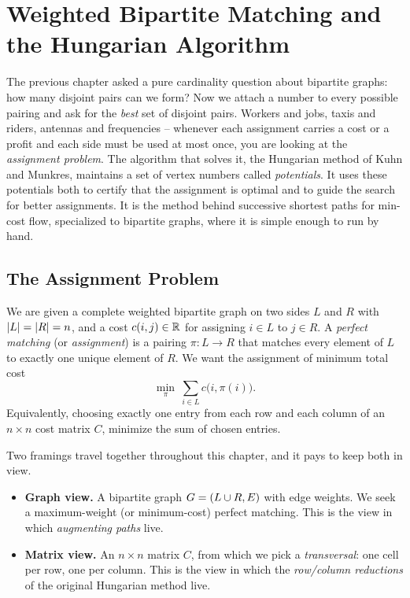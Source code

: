 \chapter{Weighted Bipartite Matching and the Hungarian Algorithm}

The previous chapter asked a pure cardinality question about bipartite graphs: how many disjoint pairs can we form? Now we attach a number to every possible pairing and ask for the \emph{best} set of disjoint pairs. Workers and jobs, taxis and riders, antennas and frequencies -- whenever each assignment carries a cost or a profit and each side must be used at most once, you are looking at the \emph{assignment problem}. The algorithm that solves it, the Hungarian method of Kuhn and Munkres, maintains a set of vertex numbers called \emph{potentials}. It uses these potentials both to certify that the assignment is optimal and to guide the search for better assignments. It is the method behind successive shortest paths for min-cost flow, specialized to bipartite graphs, where it is simple enough to run by hand.

\chapterline

\section{The Assignment Problem}
\label{ch16:assignment}

\begin{focusbox}
We are given a complete weighted bipartite graph on two sides $L$ and $R$ with $\lvert L\rvert=\lvert R\rvert=n$, and a cost $c(i,j)\in\mathbb{R}$ for assigning $i\in L$ to $j\in R$. A \emph{perfect matching} (or \emph{assignment}) is a pairing $\pi:L\to R$ that matches every element of $L$ to exactly one unique element of $R$. We want the assignment of minimum total cost
\[
  \min_{\pi}\ \sum_{i\in L} c\bigl(i,\pi(i)\bigr).
\]
Equivalently, choosing exactly one entry from each row and each column of an $n\times n$ cost matrix $C$, minimize the sum of chosen entries.
\end{focusbox}

Two framings travel together throughout this chapter, and it pays to keep both in view.

\begin{itemize}
  \item \textbf{Graph view.} A bipartite graph $G=(L\cup R, E)$ with edge weights. We seek a maximum-weight (or minimum-cost) perfect matching. This is the view in which \emph{augmenting paths} live.
  \item \textbf{Matrix view.} An $n\times n$ matrix $C$, from which we pick a \emph{transversal}: one cell per row, one per column. This is the view in which the \emph{row/column reductions} of the original Hungarian method live.
\end{itemize}

